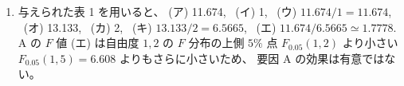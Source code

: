 \documentclass[./main.tex]{subfiles}
\begin{document}
\begin{enumerate}
\begin{align*}
                &= bcr \sum_{i=1}^a \left[ 
                    \alpha_i + ( \bar{\varepsilon}_{(1)i\cdot} - \bar{\varepsilon}_{(1)\cdot\cdot})
                        + ( \bar{\varepsilon}_{(2)i\cdot\cdot\cdot} - \bar{\varepsilon}_{(2)\cdot\cdot\cdot\cdot})
                 \right]^2\\
                &= bcr \sum_{i=1}^a \left[ 
                    \alpha_i^2 + ( \bar{\varepsilon}_{(1)i\cdot} - \bar{\varepsilon}_{(1)\cdot\cdot})^2
                        + ( \bar{\varepsilon}_{(2)i\cdot\cdot\cdot} - \bar{\varepsilon}_{(2)\cdot\cdot\cdot\cdot})^2
                 \right]
        \end{align*}
        ここでも cross term が 0 になることを用いている。
        1 次誤差, 2 次誤差はともに期待値が $0$ となるようにモデルを設定できるので、その条件のもとで
        \begin{equation*}
            E [ \bar{\varepsilon}_{(1)i\cdot}] = E [ \bar{\varepsilon}_{(2)i\cdot\cdot\cdot}] = 0, \quad
            V [ \bar{\varepsilon}_{(1)i\cdot}] = \frac{1}{r} \sigma_{(1)}^2, \quad
            V [ \bar{\varepsilon}_{(2)i\cdot\cdot\cdot}] = \frac{1}{bcr} \sigma_{(2)}^2
        \end{equation*}
        であるので、公式 \eqref{eq:2024-ouyo-rikou-1-unbiased-var} を適用して
        \begin{align*}
            E[ S_A ]
                &= bcr \sum_{i=1}^a \alpha_i^2 + bcr \left[
                    (a - 1) \cdot \frac{1}{r}\sigma_{(1)}^2
                    + (a - 1) \cdot \frac{1}{bcr} \sigma_{(2)}^2
                \right]\\
                &= bcr \sum_{i=1}^a \alpha_i^2
                    + (a - 1) bc \sigma_{(1)}^2
                    + (a - 1) \sigma_{(2)}^2\\
                &= 18 (\alpha_1^2 + \alpha_2^2) + 6 \sigma_{(1)}^2 + \sigma_{(2)}^2.
        \end{align*}


        \item 与えられた表 1 を用いると、
        (ア) 11.674, \
        (イ) 1, \ 
        (ウ) $11.674 / 1 = 11.674$, \ 
        (オ) 13.133, \ 
        (カ) 2, \ 
        (キ) $13.133 / 2 = 6.5665$, \
        (エ) $11.674 / 6.5665 \simeq 1.7778$.\\
        A の $F$ 値 (エ) は自由度 $1, 2$ の $F$ 分布の上側 $5 \%$ 点 $F_{0.05} (1, 2)$ より小さい $F_{0.05} (1, 5) = 6.608$ よりもさらに小さいため、
        要因 A の効果は有意ではない。
        
    \end{enumerate}
\end{document}
